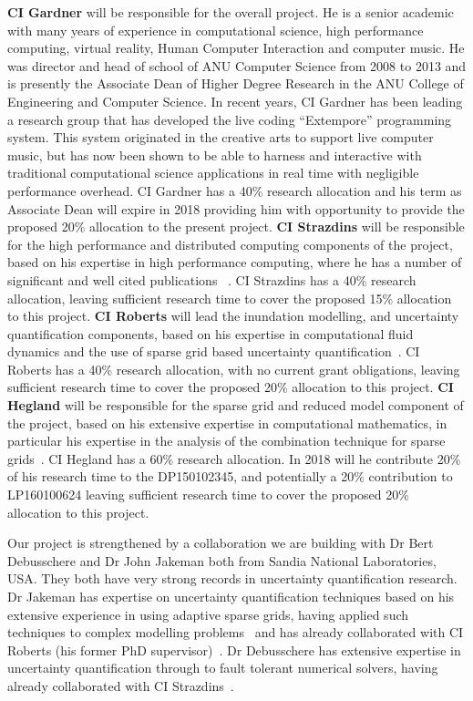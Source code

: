 {\bf CI Gardner} will be responsible for the overall project. He is a senior
academic with many years of experience in computational science, high
performance computing, virtual reality, Human Computer Interaction and
computer music. He was director and head of school of ANU Computer
Science from 2008 to 2013 and is presently the Associate Dean of
Higher Degree Research in the ANU College of Engineering and Computer
Science. In recent years, CI Gardner has been leading a research group
that has developed the live coding ``Extempore'' programming
system. This system originated in the creative arts to support live
computer music, but has now been shown to be able to harness and
interactive with traditional computational science applications in
real time with negligible performance overhead. CI Gardner has a 40\%
research allocation and his term as Associate Dean will expire in 2018
providing him with opportunity to provide the proposed 20\% allocation
to the present project.
%
{\bf CI Strazdins} will be responsible for the high performance and
distributed computing components of the project, based on his
expertise in high performance computing, where he has a number of
significant and well cited publications
~\parencite{AliEtal2015,sgctalg15,Ali11022016}.  CI Strazdins
has a 40\% research allocation, leaving sufficient research time to
cover the proposed 15\% allocation to this project.
%
{\bf CI Roberts} will lead the inundation modelling, and uncertainty
quantification components, based on his expertise in computational
fluid dynamics and the use of sparse grid based uncertainty
quantification~\parencite{deBaarRDM2015,JakemanRoberts2013,anugamanual,nielsen2005hydrodynamic}.
CI Roberts has a 40\% research allocation, with no current grant
obligations, leaving sufficient research time to cover the proposed
20\% allocation to this project.
%
{\bf CI Hegland} will be responsible for the sparse grid and reduced
model component of the project, based on his extensive expertise in
computational mathematics, in particular his expertise in the analysis
of the combination technique for sparse
grids~\parencite{AliEtal2015,HardingHLS2015,Ali11022016}.  CI Hegland
has a 60\% research allocation. In 2018 will he contribute 20\% of his
research time to the DP150102345, and potentially a 20\% contribution
to LP160100624 leaving sufficient research time to cover the proposed
20\% allocation to this project.


Our project is strengthened by a collaboration we are building with Dr
Bert Debusschere and Dr John Jakeman both from Sandia National
Laboratories, USA. They both have very strong records in uncertainty
quantification research.  Dr Jakeman has expertise on uncertainty
quantification techniques based on his extensive experience in using
adaptive sparse grids, having applied such techniques to complex
modelling problems~\parencite{JakemanRoberts2013,jakemanNumerical2010,
  Jakeman2015} and has already collaborated with CI Roberts (his
former PhD supervisor)~\parencite{JakemanRoberts2013}.  Dr Debusschere
has extensive expertise in uncertainty quantification through to fault
tolerant numerical solvers, having already collaborated with CI
Strazdins~\parencite{parSGCT16}.  

